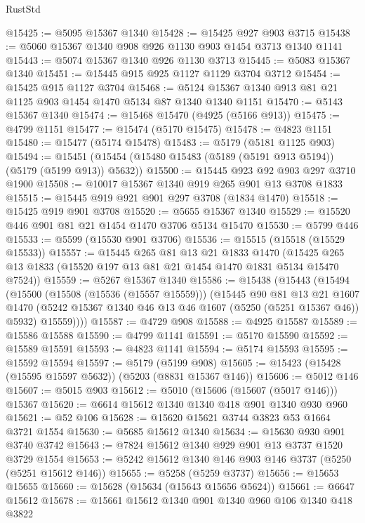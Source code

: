 \begin{lexlean}{RustStd}
\begin{coremodule}
@15425 := @5095 @15367 @1340
@15428 := @15425 @927 @903 @3715
@15438 := @5060 @15367 @1340 @908 @926 @1130 @903 @1454 @3713 @1340 @1141
@15443 := @5074 @15367 @1340 @926 @1130 @3713
@15445 := @5083 @15367 @1340
@15451 := @15445 @915 @925 @1127 @1129 @3704 @3712
@15454 := @15425 @915 @1127 @3704
@15468 := @5124 @15367 @1340 @913 @81 @21 @1125 @903 @1454 @1470 @5134 @87 @1340 @1340 @1151
@15470 := @5143 @15367 @1340
@15474 := @15468 @15470 (@4925 (@5166 @913))
@15475 := @4799 @1151
@15477 := @15474 (@5170 @15475)
@15478 := @4823 @1151
@15480 := @15477 (@5174 @15478)
@15483 := @5179 (@5181 @1125 @903)
@15494 := @15451 (@15454 (@15480 @15483 (@5189 (@5191 @913 @5194)) (@5179 (@5199 @913)) @5632))
@15500 := @15445 @923 @92 @903 @297 @3710 @1900
@15508 := @10017 @15367 @1340 @919 @265 @901 @13 @3708 @1833
@15515 := @15445 @919 @921 @901 @297 @3708 (@1834 @1470)
@15518 := @15425 @919 @901 @3708
@15520 := @5655 @15367 @1340
@15529 := @15520 @446 @901 @81 @21 @1454 @1470 @3706 @5134 @15470
@15530 := @5799 @446
@15533 := @5599 (@15530 @901 @3706)
@15536 := @15515 (@15518 (@15529 @15533))
@15557 := @15445
    @265
    @81
    @13
    @21
    @1833
    @1470
    (@15425 @265 @13 @1833 (@15520 @197 @13 @81 @21 @1454 @1470 @1831 @5134 @15470 @7524))
@15559 := @5267 @15367 @1340
@15586 := @15438
    (@15443
      (@15494
        (@15500
          (@15508 (@15536 (@15557 @15559)))
          (@15445
            @90
            @81
            @13
            @21
            @1607
            @1470
            (@5242 @15367 @1340 @46 @13 @46 @1607 (@5250 (@5251 @15367 @46)) @5932)
            @15559))))
@15587 := @4729 @908
@15588 := @4925 @15587
@15589 := @15586 @15588
@15590 := @4799 @1141
@15591 := @5170 @15590
@15592 := @15589 @15591
@15593 := @4823 @1141
@15594 := @5174 @15593
@15595 := @15592 @15594
@15597 := @5179 (@5199 @908)
@15605 := @15423 (@15428 (@15595 @15597 @5632)) (@5203 (@8831 @15367 @146))
@15606 := @5012 @146
@15607 := @5015 @903
@15612 := @5010 (@15606 (@15607 (@5017 @146))) @15367
@15620 := @6614 @15612 @1340 @1340 @418 @901 @1340 @930 @960
@15621 := @52 @106
@15628 := @15620 @15621 @3744 @3823 @53 @1664 @3721 @1554
@15630 := @5685 @15612 @1340
@15634 := @15630 @930 @901 @3740 @3742
@15643 := @7824 @15612 @1340 @929 @901 @13 @3737 @1520 @3729 @1554
@15653 := @5242 @15612 @1340 @146 @903 @146 @3737 (@5250 (@5251 @15612 @146))
@15655 := @5258 (@5259 @3737)
@15656 := @15653 @15655
@15660 := @15628 (@15634 (@15643 @15656 @5624))
@15661 := @6647 @15612
@15678 := @15661
    @15612
    @1340
    @901
    @1340
    @960
    @106
    @1340
    @418
    @3822

\end{coremodule}
\end{lexlean}
